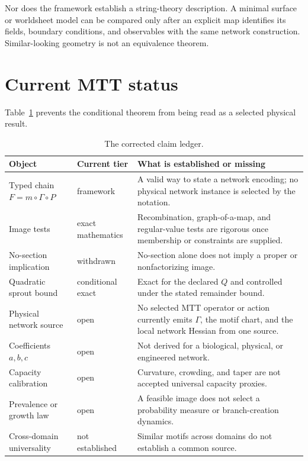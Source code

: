 \documentclass[11pt]{article}
\begin{document}
Nor does the framework establish a string-theory description.  A minimal
surface or worldsheet model can be compared only after an explicit map
identifies its fields, boundary conditions, and observables with the same
network construction.  Similar-looking geometry is not an equivalence
theorem.

\clearpage
\section{Current MTT status}

Table~\ref{tab:status} prevents the conditional theorem from being read as a
selected physical result.

\begin{table}[ht]
\centering
\small
\begin{tabularx}{\textwidth}{@{}p{}p{}X@{}}
\toprule
Object & Current tier & What is established or missing\\
\midrule
Typed chain $F=m\circ\Gamma\circ P$
& framework
& A valid way to state a network encoding; no physical network instance is
selected by the notation.\\
Image tests
& exact mathematics
& Recombination, graph-of-a-map, and regular-value tests are rigorous once
membership or constraints are supplied.\\
No-section implication
& withdrawn
& No-section alone does not imply a proper or nonfactorizing image.\\
Quadratic sprout bound
& conditional exact
& Exact for the declared $Q$ and controlled under the stated remainder
bound.\\
Physical network source
& open
& No selected MTT operator or action currently emits $\Gamma$, the motif
chart, and the local network Hessian from one source.\\
Coefficients $a,b,c$
& open
& Not derived for a biological, physical, or engineered network.\\
Capacity calibration
& open
& Curvature, crowding, and taper are not accepted universal capacity
proxies.\\
Prevalence or growth law
& open
& A feasible image does not select a probability measure or branch-creation
dynamics.\\
Cross-domain universality
& not established
& Similar motifs across domains do not establish a common source.\\
\bottomrule
\end{tabularx}
\caption{The corrected claim ledger.}
\label{tab:status}
\end{table}
\end{document}
